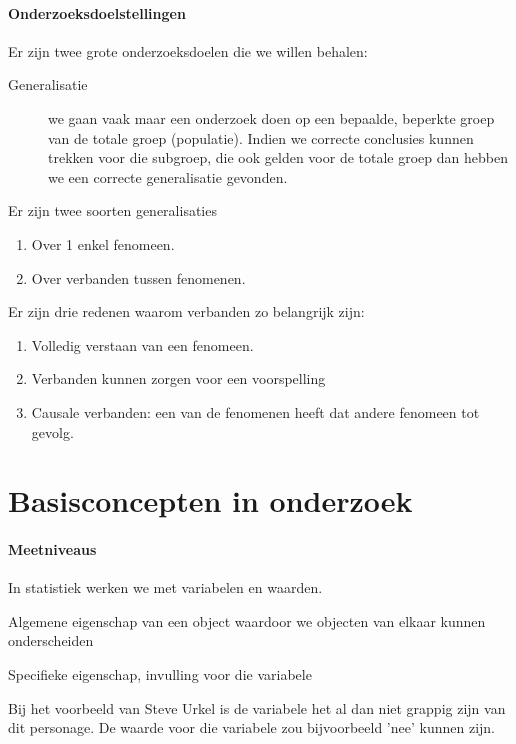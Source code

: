 \paragraph{Onderzoeksdoelstellingen}
Er zijn twee grote onderzoeksdoelen die we willen behalen:
\begin{description}
	\item [Generalisatie] we gaan vaak maar een onderzoek doen op een bepaalde, beperkte groep van de totale groep (populatie). Indien we correcte conclusies kunnen trekken voor die subgroep, die ook gelden voor de totale groep dan hebben we een correcte generalisatie gevonden. 
	\end{description}
	Er zijn twee soorten generalisaties
		\begin{enumerate}
			\item Over 1 enkel fenomeen.
			\item Over verbanden tussen fenomenen.
		\end{enumerate}
	Er zijn drie redenen waarom verbanden zo belangrijk zijn:
		\begin{enumerate}
			\item Volledig verstaan van een fenomeen. 
			\item Verbanden kunnen zorgen voor een voorspelling
			\item Causale verbanden: een van de fenomenen heeft dat andere fenomeen tot gevolg. 
		\end{enumerate}

	
\section{Basisconcepten in onderzoek}
\paragraph{Meetniveaus}
In statistiek werken we met variabelen en waarden.

\begin{definition}[Variabele]
	Algemene eigenschap van een object waardoor we objecten van elkaar kunnen onderscheiden
\end{definition}
%
\begin{definition}[Waarde]
	Specifieke eigenschap, invulling voor die variabele
\end{definition}

\begin{example}
	Bij het voorbeeld van Steve Urkel is de variabele het al dan niet grappig zijn van dit personage. De waarde voor die variabele zou bijvoorbeeld 'nee' kunnen zijn.
\end{example}

